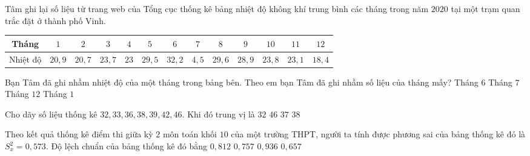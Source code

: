 \begin{ex}%
Tâm ghi lại số liệu từ trang web của Tổng cục thống kê bảng nhiệt độ không khí trung bình các tháng trong năm $2020$ tại một trạm quan trắc đặt ở thành phố Vinh.
\begin{longtable}{|c|c|c|c|c|c|c|c|c|c|c|c|c|}
\hline  
Tháng&$1$&$2$&$3$&$4$&$5$&$6$&$7$&$8$&$9$&$10$&$11$&$12$\\
\hline
Nhiệt độ&$20{,}9$&$20{,}7$&$23{,}7$&$23$&$29{,}5$&$32{,}2$&$4{,}5$&$29{,}6$&$28{,}9$&$23{,}8$&$23{,}1$&$18{,}4$\\
\hline
\end{longtable}\noindent
Bạn Tâm đã ghi nhầm nhiệt độ của một tháng trong bảng bên. Theo em bạn Tâm đã ghi nhầm số liệu của tháng mấy?
\choice
{Tháng $6$}
{\True Tháng $7$}
{Tháng $12$}
{Tháng $1$}
\end{ex}

\begin{ex}%
Cho dãy số liệu thống kê  $32, 33, 36, 38, 39, 42, 46$. Khi đó  trung vị là
\choice
{$32$}
{$46$}
{$37$}
{\True $38$}
\end{ex}

\begin{ex}%
Theo kết quả thống kê điểm thi giữa kỳ $2$ môn toán khối $10$ của một trường THPT, người ta tính được phương sai của bảng thống kê đó là $S_x^2=0{,}573$. Độ lệch chuẩn của bảng thống kê đó bằng
\choice
{$0{,}812$}
{\True $0{,}757$}
{$0{,}936$}
{$0{,}657$}
\end{ex}


